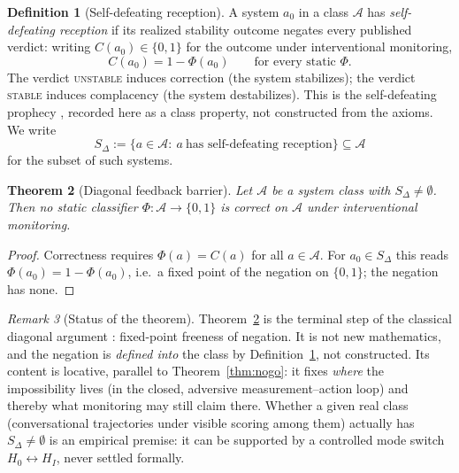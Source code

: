 \documentclass[11pt]{article}
\theoremstyle{plain}
\newtheorem{theorem}{Theorem}[section]
\theoremstyle{definition}
\newtheorem{definition}[theorem]{Definition}
\theoremstyle{remark}
\newtheorem{remark}[theorem]{Remark}
\begin{document}
\begin{definition}[Self-defeating reception]\label{def:sdelta}
A system $a_0$ in a class $\mathcal A$ has \emph{self-defeating reception} if its realized stability outcome negates every published verdict: writing $C(a_0)\in\{0,1\}$ for the outcome under interventional monitoring,
\[
C(a_0)=1-\Phi(a_0)\qquad\text{for every static }\Phi.
\]
The verdict \textsc{unstable} induces correction (the system stabilizes); the verdict \textsc{stable} induces complacency (the system destabilizes). This is the self-defeating prophecy \citep{merton1948}, recorded here as a class property, not constructed from the axioms. We write
\[
S_\Delta:=\{a\in\mathcal A:\ a\ \text{has self-defeating reception}\}\subseteq\mathcal A
\]
for the subset of such systems.
\end{definition}

\begin{theorem}[Diagonal feedback barrier]\label{thm:nogo2}
Let $\mathcal A$ be a system class with $S_\Delta\ne\emptyset$. Then no static classifier $\Phi:\mathcal A\to\{0,1\}$ is correct on $\mathcal A$ under interventional monitoring.
\end{theorem}
\begin{proof}
Correctness requires $\Phi(a)=C(a)$ for all $a\in\mathcal A$. For $a_0\in S_\Delta$ this reads $\Phi(a_0)=1-\Phi(a_0)$, i.e.\ a fixed point of the negation on $\{0,1\}$; the negation has none.
\end{proof}

\begin{remark}[Status of the theorem]\label{rem:status2}
Theorem~\ref{thm:nogo2} is the terminal step of the classical diagonal argument \citep{lawvere1969,yanofsky2003}: fixed-point freeness of negation. It is not new mathematics, and the negation is \emph{defined into} the class by Definition~\ref{def:sdelta}, not constructed. Its content is locative, parallel to Theorem~\ref{thm:nogo}: it fixes \emph{where} the impossibility lives (in the closed, adversive measurement--action loop) and thereby what monitoring may still claim there. Whether a given real class (conversational trajectories under visible scoring among them) actually has $S_\Delta\ne\emptyset$ is an empirical premise: it can be supported by a controlled mode switch $H_0\leftrightarrow H_I$, never settled formally.
\end{remark}
\end{document}
